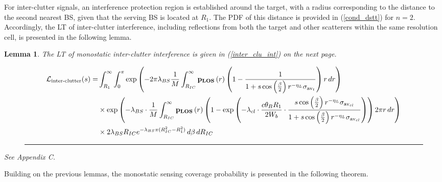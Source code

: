 \documentclass[journal]{IEEEtran}
\newtheorem{lemma}{\textbf{Lemma}}
\begin{document}
For inter-clutter signals, an interference protection region is established around the target, with a radius corresponding to the distance to the second nearest BS, given that the serving BS is located at \( R_1 \). The PDF of this distance is provided in (\ref{cond_dstt}) for \( n=2 \).  Accordingly, the LT of inter-clutter interference, including reflections from both the target and other scatterers within the same resolution cell, is presented in the following lemma.
\begin{lemma} \label{inter_clu}
The LT of monostatic inter-clutter interference is given in (\ref{inter_clu_int}) on the next page.
\begin{figure*}[h]
\begin{equation}\label{inter_clu_int}
\begin{aligned}
\mathcal{L}_{\text{inter-clutter}}(s) = & \int_{R_1}^{\infty} \int_{0}^{\pi} 
\exp \left( - 2 \pi \lambda_{BS} \frac{1}{M} \int_{R_{IC}}^{\infty} \bold p_{\bold{LOS}}\left(r\right)  \left( 1 - \frac{1}{1 + s \cos\left( \frac{\beta}{2} \right) r^{-\eta_L} \sigma_{\text{av}_t}} \right) r \, dr \right) \\
& \times \exp \left( - \lambda_{BS} \cdot \frac{1}{M} \int_{R_{IC}}^{\infty}  \bold p_{\bold{LOS}}\left(r\right)  \left( 1 - \exp \left( - \lambda_{cl} \cdot \frac{c \theta_B R_1}{2 W_b} \cdot \frac{s \cos \left( \frac{\beta}{2} \right) r^{-\eta_L} \sigma_{\text{av}_{cl}}}{1 + s \cos \left( \frac{\beta}{2} \right) r^{-\eta_L} \sigma_{\text{av}_{cl}}} \right) \right) 2 \pi r \, dr \right) \\
& \times 2 \lambda_{BS}  R_{IC} e^{-\lambda_{BS} \pi (R_{IC}^2 - R_1^2)}  \,  d\beta  \, dR_{IC}
\end{aligned}
\end{equation}
\hrule
\end{figure*}
\begin{IEEEproof}
See Appendix C.
\end{IEEEproof}
\end{lemma}
Building on the previous lemmas, the monostatic sensing coverage probability is presented in the following theorem.
\end{document}
